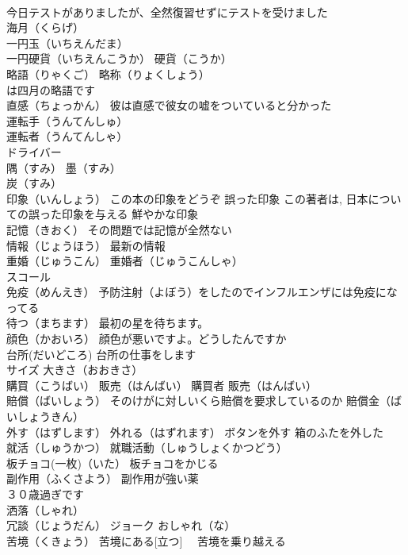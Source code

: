 \documentclass[8pt]{extreport}
\begin{document}
\begin{CJK}{UTF8}{min}
\\	今日テストがありましたが、全然復習せずにテストを受けました
\\	海月（くらげ）
\\	一円玉（いちえんだま）
\\	一円硬貨（いちえんこうか） 硬貨（こうか）
\\	略語（りゃくご） 略称（りょくしょう） 
\\	は四月の略語です
\\	直感（ちょっかん） 彼は直感で彼女の嘘をついていると分かった
\\	運転手（うんてんしゅ） 
\\	運転者（うんてんしゃ） 
\\	ドライバー
\\	隅（すみ） 墨（すみ）
\\	炭（すみ）
\\	印象（いんしょう） この本の印象をどうぞ 誤った印象 この著者は, 日本についての誤った印象を与える 鮮やかな印象
\\	記憶（きおく） その問題では記憶が全然ない
\\	情報（じょうほう） 最新の情報
\\	重婚（じゅうこん） 重婚者（じゅうこんしゃ）
\\	スコール
\\	免疫（めんえき） 予防注射（よぼう）をしたのでインフルエンザには免疫になってる
\\	待つ（まちます） 最初の星を待ちます。
\\	顔色（かおいろ） 顔色が悪いですよ。どうしたんですか
\\	台所(だいどころ) 台所の仕事をします
\\	サイズ 大きさ（おおきさ）
\\	購買（こうばい） 販売（はんばい） 購買者 販売（はんばい）
\\	賠償（ばいしょう） そのけがに対しいくら賠償を要求しているのか 賠償金（ばいしょうきん）
\\	外す（はずします） 外れる（はずれます） ボタンを外す 箱のふたを外した
\\	就活（しゅうかつ） 就職活動（しゅうしょくかつどう）
\\	板チョコ(一枚)（いた） 板チョコをかじる
\\	副作用（ふくさよう） 副作用が強い薬
\\	３０歳過ぎです
\\	洒落（しゃれ）
\\	冗談（じょうだん） ジョーク おしゃれ（な） 
\\	苦境（くきょう） 苦境にある[立つ]　 苦境を乗り越える

\end{CJK}
\end{document}
